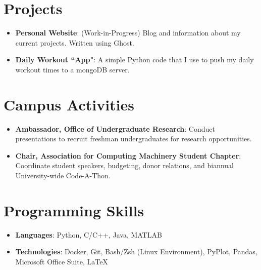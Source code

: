 \documentclass[letterpaper,11pt]{article}
\newcommand{\resumeItem}[2]{
  \item\small{
    \textbf{#1}{: #2 \vspace{-2pt}}
  }
}
\newcommand{\resumeSubItem}[2]{\resumeItem{#1}{#2}\vspace{-4pt}}
\newcommand{\resumeSubHeadingListStart}{\begin{itemize}[leftmargin=*]}
\newcommand{\resumeSubHeadingListEnd}{\end{itemize}}
\begin{document}
\section{Projects}
  \resumeSubHeadingListStart
    \resumeSubItem{Personal Website}
      {(Work-in-Progress) Blog and information about my current projects. Written using Ghost.}
    \resumeSubItem{Daily Workout ``App"}
      {A simple Python code that I use to push my daily workout times to a mongoDB server.}
  \resumeSubHeadingListEnd


\section{Campus Activities}
  \resumeSubHeadingListStart
    \resumeSubItem{Ambassador, Office of Undergraduate Research}
      {Conduct presentations to recruit freshman undergraduates for research opportunities.}
    \resumeSubItem{Chair, Association for Computing Machinery Student Chapter}
      {Coordinate student speakers, budgeting, donor relations, and biannual University-wide Code-A-Thon.}
  \resumeSubHeadingListEnd

%
\section{Programming Skills}
  \resumeSubHeadingListStart
    \resumeSubItem{Languages}{Python, C/C++, Java, MATLAB}
    \resumeSubItem{Technologies}{Docker, Git, Bash/Zsh (Linux Environment), PyPlot, Pandas, Microsoft Office Suite, \LaTeX}
  \resumeSubHeadingListEnd


\end{document}

